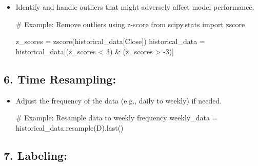 \documentclass[
  letterpaper,
  DIV=11,
  numbers=noendperiod]{scrreprt}
\newenvironment{Shaded}{\begin{snugshade}}{\end{snugshade}}
\newcommand{\CommentTok}[1]{\textcolor[rgb]{0.37,0.37,0.37}{#1}}
\newcommand{\DecValTok}[1]{\textcolor[rgb]{0.68,0.00,0.00}{#1}}
\newcommand{\ImportTok}[1]{\textcolor[rgb]{0.00,0.46,0.62}{#1}}
\newcommand{\NormalTok}[1]{\textcolor[rgb]{0.00,0.23,0.31}{#1}}
\newcommand{\OperatorTok}[1]{\textcolor[rgb]{0.37,0.37,0.37}{#1}}
\newcommand{\StringTok}[1]{\textcolor[rgb]{0.13,0.47,0.30}{#1}}
\begin{document}
\begin{itemize}
\item
  Identify and handle outliers that might adversely affect model
  performance.

\begin{Shaded}
\begin{Highlighting}[]
\CommentTok{\# Example: Remove outliers using z{-}score}
\ImportTok{from}\NormalTok{ scipy.stats }\ImportTok{import}\NormalTok{ zscore}

\NormalTok{z\_scores }\OperatorTok{=}\NormalTok{ zscore(historical\_data[}\StringTok{\textquotesingle{}Close\textquotesingle{}}\NormalTok{])}
\NormalTok{historical\_data }\OperatorTok{=}\NormalTok{ historical\_data[(z\_scores }\OperatorTok{\textless{}} \DecValTok{3}\NormalTok{) }\OperatorTok{\&}\NormalTok{ (z\_scores }\OperatorTok{\textgreater{}} \OperatorTok{{-}}\DecValTok{3}\NormalTok{)]}
\end{Highlighting}
\end{Shaded}
\end{itemize}

\subsection{\texorpdfstring{6. \textbf{Time
Resampling:}}{6. Time Resampling:}}\label{time-resampling}

\begin{itemize}
\item
  Adjust the frequency of the data (e.g., daily to weekly) if needed.

\begin{Shaded}
\begin{Highlighting}[]
\CommentTok{\# Example: Resample data to weekly frequency}
\NormalTok{weekly\_data }\OperatorTok{=}\NormalTok{ historical\_data.resample(}\StringTok{\textquotesingle{}D\textquotesingle{}}\NormalTok{).last()}
\end{Highlighting}
\end{Shaded}
\end{itemize}

\subsection{\texorpdfstring{7.
\textbf{Labeling:}}{7. Labeling:}}\label{labeling}
\end{document}
